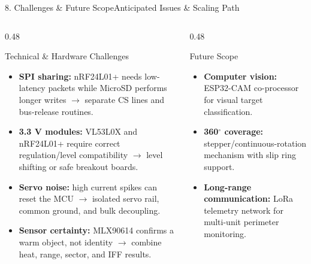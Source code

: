 \documentclass[aspectratio=169, 10pt]{beamer}
\begin{document}
\begin{frame}{8. Challenges \& Future Scope}{Anticipated Issues \& Scaling Path}
    \begin{columns}[T]
        \begin{column}{0.48\textwidth}
            \begin{block}{Technical \& Hardware Challenges}
                \footnotesize
                \begin{itemize}
                    \item \textbf{SPI sharing:} nRF24L01+ needs low-latency packets while MicroSD performs longer writes $\rightarrow$ separate CS lines and bus-release routines.
                    \item \textbf{3.3 V modules:} VL53L0X and nRF24L01+ require correct regulation/level compatibility $\rightarrow$ level shifting or safe breakout boards.
                    \item \textbf{Servo noise:} high current spikes can reset the MCU $\rightarrow$ isolated servo rail, common ground, and bulk decoupling.
                    \item \textbf{Sensor certainty:} MLX90614 confirms a warm object, not identity $\rightarrow$ combine heat, range, sector, and IFF results.
                \end{itemize}
            \end{block}
        \end{column}
        \begin{column}{0.48\textwidth}
            \begin{block}{Future Scope}
                \footnotesize
                \begin{itemize}
                    \item \textbf{Computer vision:} ESP32-CAM co-processor for visual target classification.
                    \item \textbf{360$^\circ$ coverage:} stepper/continuous-rotation mechanism with slip ring support.
                    \item \textbf{Long-range communication:} LoRa telemetry network for multi-unit perimeter monitoring.
                \end{itemize}
            \end{block}
        \end{column}
    \end{columns}
\end{frame}
\end{document}
